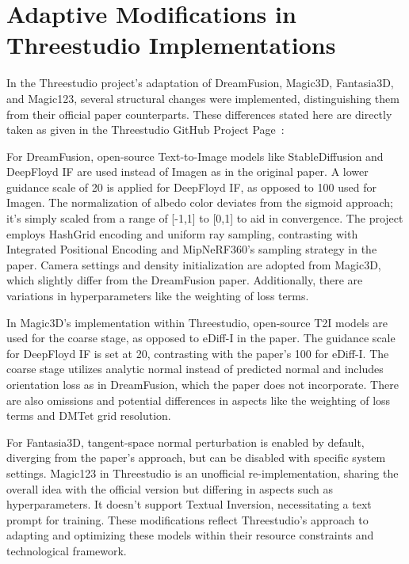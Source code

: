 \chapter{Adaptive Modifications in Threestudio Implementations}\label{ch:differences}



In the Threestudio project's adaptation of DreamFusion, Magic3D, Fantasia3D, and Magic123, several structural changes were implemented, distinguishing them from their official paper counterparts. These differences stated here are directly taken as given in the Threestudio GitHub Project Page~\citep{threestudio2023}: 

For DreamFusion, open-source Text-to-Image models like StableDiffusion and DeepFloyd IF are used instead of Imagen as in the original paper. A lower guidance scale of 20 is applied for DeepFloyd IF, as opposed to 100 used for Imagen. The normalization of albedo color deviates from the sigmoid approach; it's simply scaled from a range of [-1,1] to [0,1] to aid in convergence. The project employs HashGrid encoding and uniform ray sampling, contrasting with Integrated Positional Encoding and MipNeRF360's sampling strategy in the paper. Camera settings and density initialization are adopted from Magic3D, which slightly differ from the DreamFusion paper. Additionally, there are variations in hyperparameters like the weighting of loss terms.

In Magic3D's implementation within Threestudio, open-source T2I models are used for the coarse stage, as opposed to eDiff-I in the paper. The guidance scale for DeepFloyd IF is set at 20, contrasting with the paper's 100 for eDiff-I. The coarse stage utilizes analytic normal instead of predicted normal and includes orientation loss as in DreamFusion, which the paper does not incorporate. There are also omissions and potential differences in aspects like the weighting of loss terms and DMTet grid resolution.

For Fantasia3D, tangent-space normal perturbation is enabled by default, diverging from the paper's approach, but can be disabled with specific system settings. Magic123 in Threestudio is an unofficial re-implementation, sharing the overall idea with the official version but differing in aspects such as hyperparameters. It doesn't support Textual Inversion, necessitating a text prompt for training. These modifications reflect Threestudio's approach to adapting and optimizing these models within their resource constraints and technological framework.

